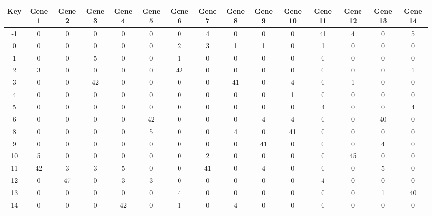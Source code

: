 \begin{tabular}{|c|c|c|c|c|c|c|c|c|c|c|c|c|c|c|}
\hline
Key & Gene 1 & Gene 2 & Gene 3 & Gene 4 & Gene 5 & Gene 6 & Gene 7 & Gene 8 & Gene 9 & Gene 10 & Gene 11 & Gene 12 & Gene 13 & Gene 14 \\
\hline
-1 & 0 & 0 & 0 & 0 & 0 & 0 & 4 & 0 & 0 & 0 & 41 & 4 & 0 & 5 \\
0 & 0 & 0 & 0 & 0 & 0 & 2 & 3 & 1 & 1 & 0 & 1 & 0 & 0 & 0 \\
1 & 0 & 0 & 5 & 0 & 0 & 1 & 0 & 0 & 0 & 0 & 0 & 0 & 0 & 0 \\
2 & 3 & 0 & 0 & 0 & 0 & 42 & 0 & 0 & 0 & 0 & 0 & 0 & 0 & 1 \\
3 & 0 & 0 & 42 & 0 & 0 & 0 & 0 & 41 & 0 & 4 & 0 & 1 & 0 & 0 \\
4 & 0 & 0 & 0 & 0 & 0 & 0 & 0 & 0 & 0 & 1 & 0 & 0 & 0 & 0 \\
5 & 0 & 0 & 0 & 0 & 0 & 0 & 0 & 0 & 0 & 0 & 4 & 0 & 0 & 4 \\
6 & 0 & 0 & 0 & 0 & 42 & 0 & 0 & 0 & 4 & 4 & 0 & 0 & 40 & 0 \\
8 & 0 & 0 & 0 & 0 & 5 & 0 & 0 & 4 & 0 & 41 & 0 & 0 & 0 & 0 \\
9 & 0 & 0 & 0 & 0 & 0 & 0 & 0 & 0 & 41 & 0 & 0 & 0 & 4 & 0 \\
10 & 5 & 0 & 0 & 0 & 0 & 0 & 2 & 0 & 0 & 0 & 0 & 45 & 0 & 0 \\
11 & 42 & 3 & 3 & 5 & 0 & 0 & 41 & 0 & 4 & 0 & 0 & 0 & 5 & 0 \\
12 & 0 & 47 & 0 & 3 & 3 & 0 & 0 & 0 & 0 & 0 & 4 & 0 & 0 & 0 \\
13 & 0 & 0 & 0 & 0 & 0 & 4 & 0 & 0 & 0 & 0 & 0 & 0 & 1 & 40 \\
14 & 0 & 0 & 0 & 42 & 0 & 1 & 0 & 4 & 0 & 0 & 0 & 0 & 0 & 0 \\
\hline
\end{tabular}